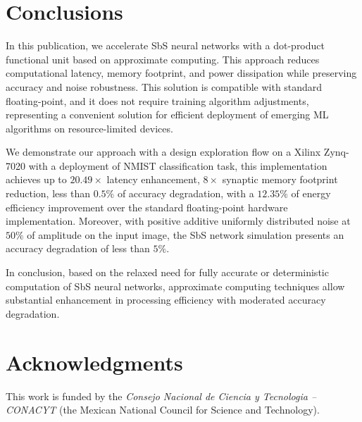 \section{Conclusions}
\label{sec:conclusions}
In this publication, we accelerate SbS neural networks with a dot-product functional unit based on approximate computing. This approach reduces computational latency, memory footprint, and power dissipation while preserving accuracy and noise robustness. This solution is compatible with standard floating-point, and it does not require training algorithm adjustments, representing a convenient solution for efficient deployment of emerging ML algorithms on resource-limited devices.

We demonstrate our approach with a design exploration flow on a Xilinx Zynq-7020 with a deployment of NMIST classification task, this implementation achieves up to $20.49\times$ latency enhancement, $8\times$ synaptic memory footprint reduction, less than $0.5\%$ of accuracy degradation, with a $12.35\%$ of energy efficiency improvement over the standard floating-point hardware implementation. Moreover, with positive additive uniformly distributed noise at $50\%$ of amplitude on the input image, the SbS network simulation presents an accuracy degradation of less than $5\%$.

In conclusion, based on the relaxed need for fully accurate or deterministic computation of SbS neural networks, approximate computing techniques allow substantial enhancement in processing efficiency with moderated accuracy degradation.

\section * {Acknowledgments}\label{sec:Ack}
This work is funded by the \textit{Consejo Nacional de Ciencia y Tecnologia -- CONACYT} (the Mexican National Council for Science and Technology).
